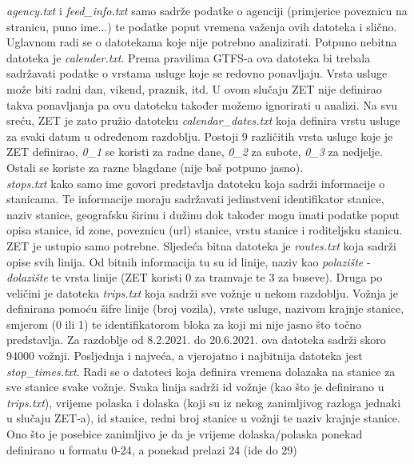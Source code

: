 \documentclass[times, utf8, diplomski]{fer}
\begin{document}
\emph{agency.txt} i \emph{feed\_info.txt} samo sadrže podatke o agenciji (primjerice poveznicu na stranicu, puno ime...) te podatke poput vremena važenja ovih datoteka i slično. Uglavnom radi se o datotekama koje nije potrebno analizirati. Potpuno nebitna datoteka je \emph{calender.txt}. Prema pravilima GTFS-a ova datoteka bi trebala sadržavati podatke o vrstama usluge koje se redovno ponavljaju. Vrsta usluge može biti radni dan, vikend, praznik, itd. U ovom slučaju ZET nije definirao takva ponavljanja pa ovu datoteku također možemo ignorirati u analizi. Na svu sreću, ZET je zato pružio datoteku \emph{calendar\_dates.txt} koja definira vrstu usluge za svaki datum u određenom razdoblju. Postoji 9 različitih vrsta usluge koje je ZET definirao, \emph{0\_1} se koristi za radne dane, \emph{0\_2} za subote, \emph{0\_3} za nedjelje. Ostali se koriste za razne blagdane (nije baš potpuno jasno). \\
\emph{stops.txt} kako samo ime govori predstavlja datoteku koja sadrži informacije o stanicama. Te informacije moraju sadržavati jedinstveni identifikator stanice, naziv stanice, geografsku širinu i dužinu dok također mogu imati podatke poput opisa stanice, id zone, poveznicu (url) stanice, vrstu stanice i roditeljsku  stanicu. ZET je ustupio samo potrebne. Sljedeća bitna datoteka je \emph{routes.txt} koja sadrži opise svih linija. Od bitnih informacija tu su id linije, naziv kao \emph{polazište} - \emph{dolazište} te vrsta linije (ZET koristi 0 za tramvaje te 3 za buseve). Druga po veličini je datoteka \emph{trips.txt} koja sadrži sve vožnje u nekom razdoblju. Vožnja je definirana pomoću šifre linije (broj vozila), vrste usluge, nazivom krajnje stanice, smjerom (0 ili 1) te identifikatorom bloka za koji mi nije jasno što točno predstavlja. Za razdoblje od 8.2.2021. do 20.6.2021. ova datoteka sadrži skoro 94000 vožnji. Posljednja i najveća, a vjerojatno i najbitnija datoteka jest \emph{stop\_times.txt}. Radi se o datoteci koja definira vremena dolazaka na stanice za sve stanice svake vožnje. Svaka linija sadrži id vožnje (kao što je definirano u \emph{trips.txt}), vrijeme polaska i dolaska (koji su iz nekog zanimljivog razloga jednaki u slučaju ZET-a), id stanice, redni broj stanice u vožnji te naziv krajnje stanice. Ono što je posebice zanimljivo je da je vrijeme dolaska/polaska ponekad definirano u formatu 0-24, a ponekad prelazi 24 (ide do 29)
\end{document}
